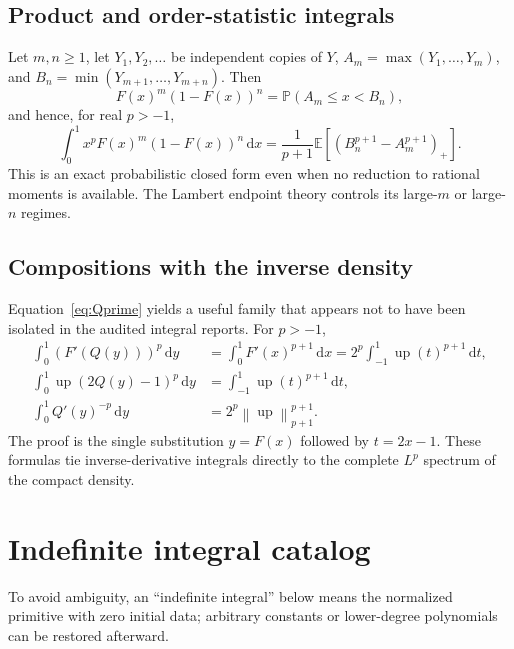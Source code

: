 \documentclass[11pt,oneside]{article}
\numberwithin{equation}{section}
\theoremstyle{plain}
\theoremstyle{definition}
\theoremstyle{remark}
\newcommand{\E}{\mathbb E}
\newcommand{\Prob}{\mathbb P}
\newcommand{\Up}{\operatorname{up}}
\newcommand{\dd}{\,\mathrm d}
\newcommand{\norm}[1]{\left\lVert#1\right\rVert}
\begin{document}
\subsection{Product and order-statistic integrals}

Let $m,n\ge1$, let $Y_1,Y_2,\ldots$ be independent copies of $Y$,
$A_m=\max(Y_1,\ldots,Y_m)$, and
$B_n=\min(Y_{m+1},\ldots,Y_{m+n})$.  Then
\begin{equation}
 F(x)^m(1-F(x))^n
 =\Prob(A_m\le x<B_n),
 \label{eq:order-gap-pointwise}
\end{equation}
and hence, for real $p>-1$,
\begin{equation}
 \int_0^1x^pF(x)^m(1-F(x))^n\dd x
 =\frac1{p+1}\E\left[(B_n^{p+1}-A_m^{p+1})_+\right].
 \label{eq:order-gap-integral}
\end{equation}
This is an exact probabilistic closed form even when no reduction to rational
moments is available.  The Lambert endpoint theory controls its large-$m$ or
large-$n$ regimes.

\subsection{Compositions with the inverse density}

Equation~\ref{eq:Qprime} yields a useful family that appears not to have been
isolated in the audited integral reports.  For $p>-1$,
\begin{align}
 \int_0^1\left(F'(Q(y))\right)^p\dd y
 &=\int_0^1F'(x)^{p+1}\dd x
 =2^p\int_{-1}^1\Up(t)^{p+1}\dd t,
 \label{eq:inverse-density-composition}\\
 \int_0^1\Up(2Q(y)-1)^p\dd y
 &=\int_{-1}^1\Up(t)^{p+1}\dd t,
 \label{eq:up-quantile-composition}\\
 \int_0^1Q'(y)^{-p}\dd y
 &=2^p\norm{\Up}_{p+1}^{p+1}.
 \label{eq:Qprime-negative-power}
\end{align}
The proof is the single substitution $y=F(x)$ followed by $t=2x-1$.
These formulas tie inverse-derivative integrals directly to the complete
$L^p$ spectrum of the compact density.

\section{Indefinite integral catalog}
\label{sec:indefinite-catalog}

To avoid ambiguity, an ``indefinite integral'' below means the normalized
primitive with zero initial data; arbitrary constants or lower-degree
polynomials can be restored afterward.
\end{document}
